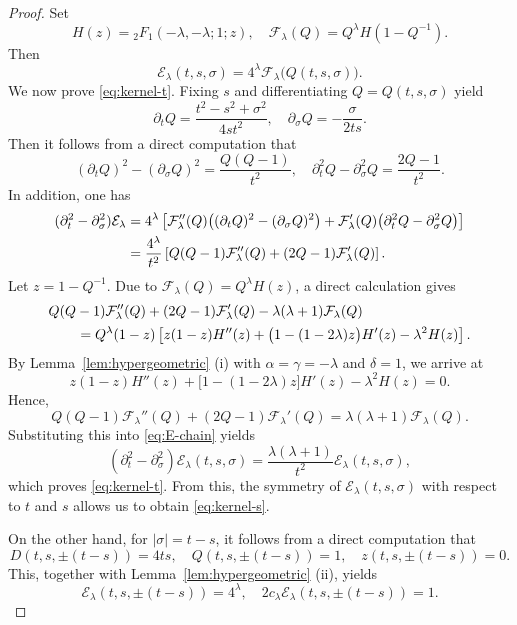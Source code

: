 \documentclass[11pt,twoside]{article}
\newcommand{\p}{\partial}
\newcommand{\f}{\frac}
\newcommand{\Ecal}{\mathcal E}
\theoremstyle{plain}
\theoremstyle{definition}
\theoremstyle{remark}
\numberwithin{equation}{section}
\begin{document}
\begin{proof}
Set
\[
H(z)={}_2F_1(-\lambda,-\lambda;1;z),
\quad
\mathcal F_\lambda(Q)=Q^\lambda H(1-Q^{-1}).
\]
Then
\[
\Ecal_\lambda(t,s,\sigma)
=4^\lambda\mathcal F_\lambda\bigl(Q(t,s,\sigma)\bigr).
\]
We now prove \eqref{eq:kernel-t}. Fixing $s$ and differentiating
$Q=Q(t,s,\sigma)$ yield
\[
\p_tQ=\f{t^2-s^2+\sigma^2}{4st^2},
\quad
\p_\sigma Q=-\f{\sigma}{2ts}.
\]
Then it follows from a direct computation that
\begin{equation}
\label{eq:Q-identities-t}
(\p_t Q)^2-(\p_\sigma Q)^2
=\f{Q(Q-1)}{t^2},
\quad
\p_t^2Q-\p_\sigma^2 Q
=\f{2Q-1}{t^2}.
\end{equation}
In addition, one has
\begin{align}
(\p_t^2-\p_\sigma^2)\Ecal_\lambda
&=
4^\lambda
\left[
\mathcal F_\lambda''(Q)
\big((\p_t Q)^2-(\p_\sigma Q)^2\big)
+\mathcal F_\lambda'(Q)
\big(\p_t^2Q-\p_\sigma^2 Q\big)
\right]\notag\\
&=
\f{4^\lambda}{t^2}
\left[
Q(Q-1)\mathcal F_\lambda''(Q)
+(2Q-1)\mathcal F_\lambda'(Q)
\right].
\label{eq:E-chain}
\end{align}
Let $z=1-Q^{-1}$. Due to
$\mathcal F_\lambda(Q)=Q^\lambda H(z)$, a direct calculation gives
\begin{align}
&Q(Q-1)\mathcal F_\lambda''(Q)
+(2Q-1)\mathcal F_\lambda'(Q)
-\lambda(\lambda+1)\mathcal F_\lambda(Q)\notag\\
&\qquad
=
Q^\lambda(1-z)
\left[
z(1-z)H''(z)
+\bigl(1-(1-2\lambda)z\bigr)H'(z)
-\lambda^2H(z)
\right].
\label{eq:F-hyper}
\end{align}
By Lemma~\ref{lem:hypergeometric} (i) with
$\alpha=\gamma=-\lambda$ and $\delta=1$, we arrive at
\[
z(1-z)H''(z)
+\bigl[1-(1-2\lambda)z\bigr]H'(z)
-\lambda^2H(z)=0.
\]
Hence,
\[
Q(Q-1)\mathcal F_\lambda''(Q)
+(2Q-1)\mathcal F_\lambda'(Q)
=
\lambda(\lambda+1)\mathcal F_\lambda(Q).
\]
Substituting this into \eqref{eq:E-chain} yields
\[
(\p_t^2-\p_\sigma^2)\Ecal_\lambda(t,s,\sigma)
=
\f{\lambda(\lambda+1)}{t^2}
\Ecal_\lambda(t,s,\sigma),
\]
which proves \eqref{eq:kernel-t}.
From this, the symmetry of $\Ecal_\lambda(t,s,\sigma)$ with respect to $t$ and $s$
allows us to obtain \eqref{eq:kernel-s}.

On the other hand, for $|\sigma|=t-s$,  it follows from a direct computation that
\[
D(t,s,\pm(t-s))=4ts,\quad Q(t,s,\pm(t-s))=1,\quad z(t,s,\pm(t-s))=0.
\]
This, together with Lemma~\ref{lem:hypergeometric} (ii), yields
\begin{equation}\label{QQ-36''}
\Ecal_\lambda(t,s,\pm(t-s))=4^\lambda,
\quad
2c_\lambda\Ecal_\lambda(t,s,\pm(t-s))=1.
\end{equation}
\end{proof}
\end{document}
